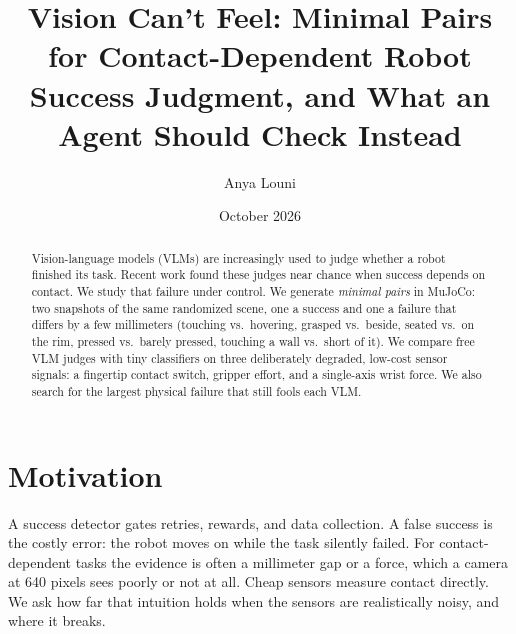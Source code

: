 \documentclass[10pt,twocolumn]{article}
\title{Vision Can't Feel: Minimal Pairs for Contact-Dependent Robot Success Judgment, and What an Agent Should Check Instead}
\author{Anya Louni}
\date{October 2026}
\begin{document}
\maketitle

\begin{abstract}
Vision-language models (VLMs) are increasingly used to judge whether a robot finished its task. Recent work found these judges near chance when success depends on contact. We study that failure under control. We generate \emph{minimal pairs} in MuJoCo: two snapshots of the same randomized scene, one a success and one a failure that differs by a few millimeters (touching vs.\ hovering, grasped vs.\ beside, seated vs.\ on the rim, pressed vs.\ barely pressed, touching a wall vs.\ short of it). We compare free VLM judges with tiny classifiers on three deliberately degraded, low-cost sensor signals: a fingertip contact switch, gripper effort, and a single-axis wrist force. We also search for the largest physical failure that still fools each VLM. 
\end{abstract}

\section{Motivation}
A success detector gates retries, rewards, and data collection. A false success is the costly error: the robot moves on while the task silently failed. For contact-dependent tasks the evidence is often a millimeter gap or a force, which a camera at 640 pixels sees poorly or not at all. Cheap sensors measure contact directly. We ask how far that intuition holds when the sensors are realistically noisy, and where it breaks.
\end{document}

